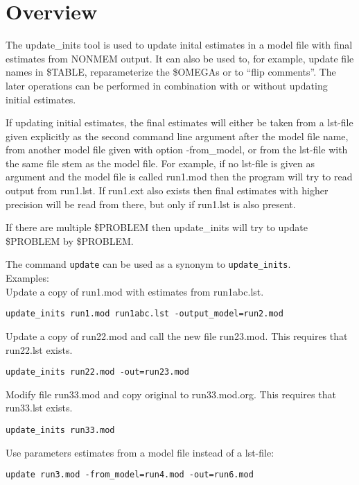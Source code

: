 
\setlength{\evensidemargin}{0pt}
\setlength{\oddsidemargin}{0pt}




\maketitle


\section{Overview}
The update\_inits tool is used to update inital estimates in a model file with final estimates from NONMEM output. It can also be used to, for example, update file names in \$TABLE, reparameterize the \$OMEGAs or to ``flip comments''. The later operations can be performed in combination with or without updating initial estimates.

If updating initial estimates, the final estimates will either be taken from a lst-file given explicitly as the second command line argument after the model file name, from another model file given with option -from\_model, or from the lst-file with the same file stem as the model file. For example, if no lst-file is given as argument and the model file is called run1.mod then the program will try to read output from run1.lst. If run1.ext also exists then final estimates with higher precision will be read from there, 
but only if run1.lst is also present.

If there are multiple \$PROBLEM then update\_inits will try to update \$PROBLEM by \$PROBLEM.

The command \verb|update| can be used as a synonym to \verb|update_inits|.\\

\noindent Examples:\\
Update a copy of run1.mod with estimates from run1abc.lst.
\begin{verbatim}
update_inits run1.mod run1abc.lst -output_model=run2.mod
\end{verbatim}
\newpage
Update a copy of run22.mod and call the new file run23.mod. This requires that run22.lst exists.
\begin{verbatim}
update_inits run22.mod -out=run23.mod
\end{verbatim}
Modify file run33.mod and copy original to run33.mod.org. This requires that run33.lst exists.
\begin{verbatim}
update_inits run33.mod
\end{verbatim}
Use parameters estimates from a model file instead of a lst-file:
\begin{verbatim}
update run3.mod -from_model=run4.mod -out=run6.mod
\end{verbatim}

